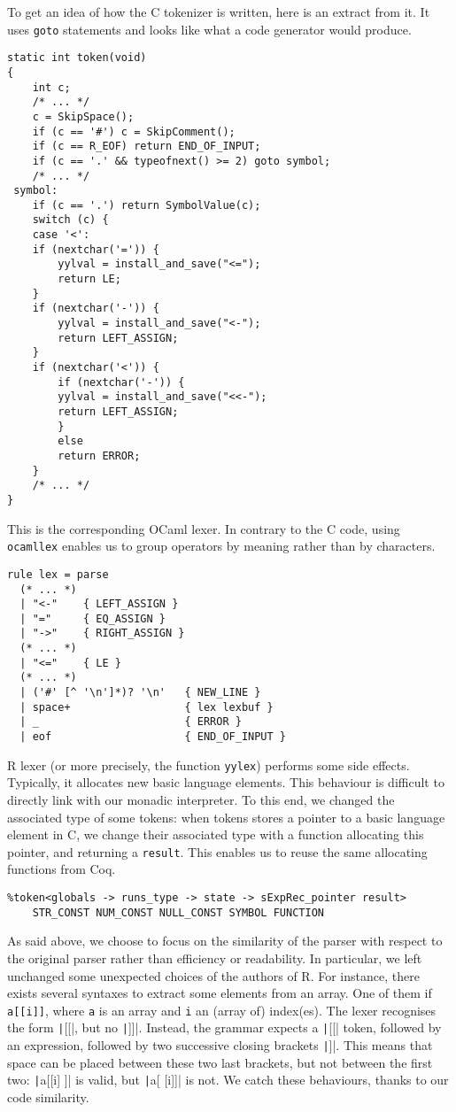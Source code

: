 \documentclass{article}
\newcommand\Coq{Coq}
\newcommand\OCaml{OCaml}
\newcommand\R{R}
\newcommand\Cn{C}
\begin{document}
To get an idea of how the \Cn{} tokenizer is written, here is an extract from it.
It uses \texttt{goto} statements and looks like
what a code generator would produce.
\begin{verbatim}
static int token(void)
{
    int c;
    /* ... */
    c = SkipSpace();
    if (c == '#') c = SkipComment();
    if (c == R_EOF) return END_OF_INPUT;
    if (c == '.' && typeofnext() >= 2) goto symbol;
    /* ... */
 symbol:
    if (c == '.') return SymbolValue(c);
    switch (c) {
    case '<':
    if (nextchar('=')) {
        yylval = install_and_save("<=");
        return LE;
    }
    if (nextchar('-')) {
        yylval = install_and_save("<-");
        return LEFT_ASSIGN;
    }
    if (nextchar('<')) {
        if (nextchar('-')) {
        yylval = install_and_save("<<-");
        return LEFT_ASSIGN;
        }
        else
        return ERROR;
    }
    /* ... */
}
\end{verbatim}
This is the corresponding \OCaml{} lexer.
In contrary to the \Cn{} code,
using \texttt{ocamllex} enables us to group operators
by meaning rather than by characters.
\begin{verbatim}
rule lex = parse
  (* ... *)
  | "<-"    { LEFT_ASSIGN }
  | "="     { EQ_ASSIGN }
  | "->"    { RIGHT_ASSIGN }
  (* ... *)
  | "<="    { LE }
  (* ... *)
  | ('#' [^ '\n']*)? '\n'   { NEW_LINE }
  | space+                  { lex lexbuf }
  | _                       { ERROR }
  | eof                     { END_OF_INPUT }
\end{verbatim}

\R{} lexer (or more precisely, the function \texttt{yylex})
performs some side effects.
Typically, it allocates new basic language elements.
This behaviour is difficult to directly link with our monadic interpreter.
To this end, we changed the associated type of some tokens:
when tokens stores a pointer to a basic language element in \Cn{},
we change their associated type with a function allocating this pointer,
and returning a \texttt{result}.
This enables us to reuse the same allocating functions from \Coq{}.
\begin{verbatim}
%token<globals -> runs_type -> state -> sExpRec_pointer result>
    STR_CONST NUM_CONST NULL_CONST SYMBOL FUNCTION
\end{verbatim}

As said above, we choose to focus on the similarity of the parser
with respect to the original parser rather than efficiency or readability.
In particular, we left unchanged some unexpected choices of the authors of \R{}.
For instance, there exists several syntaxes to extract some elements from an array.
One of them if \texttt{a[[i]]}, where \texttt{a} is an array
and \texttt{i} an (array of) index(es).
The lexer recognises the form \texttt|[[|, but no \texttt|]]|.
Instead, the grammar expects a \texttt|[[| token,
followed by an expression, followed by two successive closing brackets \texttt|]|.
This means that space can be placed between these two last brackets,
but not between the first two:
\texttt|a[[i] ]| is valid, but \texttt|a[ [i]]| is not.
We catch these behaviours, thanks to our code similarity.
\end{document}
